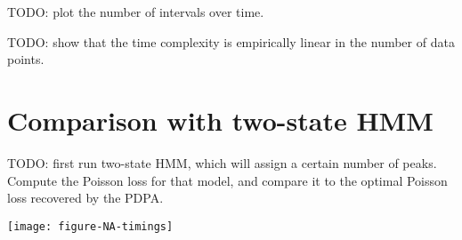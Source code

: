 \documentclass{article}
\begin{document}
TODO: plot the number of intervals over time.

TODO: show that the time complexity is empirically linear in the
number of data points.

\section{Comparison with two-state HMM}

TODO: first run two-state HMM, which will assign a certain number of
peaks. Compute the Poisson loss for that model, and compare it to the
optimal Poisson loss recovered by the PDPA.

\texttt{[image: figure-NA-timings]}



\end{document}
